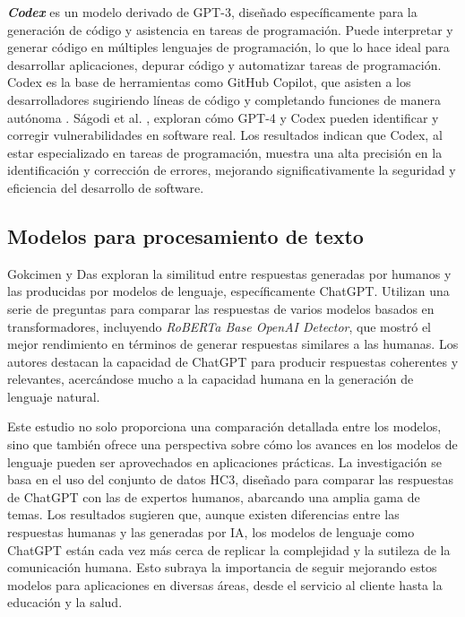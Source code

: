 \textbf{\textit{Codex}} es un modelo derivado de GPT-3, diseñado específicamente para la generación de código y asistencia en tareas de programación. Puede interpretar y generar código en múltiples lenguajes de programación, lo que lo hace ideal para desarrollar aplicaciones, depurar código y automatizar tareas de programación. Codex es la base de herramientas como GitHub Copilot, que asisten a los desarrolladores sugiriendo líneas de código y completando funciones de manera autónoma \cite{Elon2024}. Ságodi et al. \cite{Sagodi2024}, exploran cómo GPT-4 y Codex pueden identificar y corregir vulnerabilidades en software real. Los resultados indican que Codex, al estar especializado en tareas de programación, muestra una alta precisión en la identificación y corrección de errores, mejorando significativamente la seguridad y eficiencia del desarrollo de software.


\subsection{Modelos para procesamiento de texto}

Gokcimen y Das \cite{Gokcimen2023} exploran la similitud entre respuestas generadas por humanos y las producidas por modelos de lenguaje, específicamente ChatGPT. Utilizan una serie de preguntas para comparar las respuestas de varios modelos basados en transformadores, incluyendo \textit{RoBERTa Base OpenAI Detector}, que mostró el mejor rendimiento en términos de generar respuestas similares a las humanas. Los autores destacan la capacidad de ChatGPT para producir respuestas coherentes y relevantes, acercándose mucho a la capacidad humana en la generación de lenguaje natural.

Este estudio no solo proporciona una comparación detallada entre los modelos, sino que también ofrece una perspectiva sobre cómo los avances en los modelos de lenguaje pueden ser aprovechados en aplicaciones prácticas. La investigación se basa en el uso del conjunto de datos HC3, diseñado para comparar las respuestas de ChatGPT con las de expertos humanos, abarcando una amplia gama de temas. Los resultados sugieren que, aunque existen diferencias entre las respuestas humanas y las generadas por IA, los modelos de lenguaje como ChatGPT están cada vez más cerca de replicar la complejidad y la sutileza de la comunicación humana. Esto subraya la importancia de seguir mejorando estos modelos para aplicaciones en diversas áreas, desde el servicio al cliente hasta la educación y la salud.

